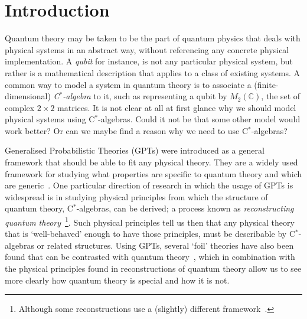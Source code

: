 \documentclass[a4paper,onecolumn,10pt,accepted=2019-05-03, issue=1, volume=1, shorttitle=papers/compositionality-1-1]{compositionalityarticle}
\numberwithin{counter}{section}
\newcommand{\C}{\mathbb{C}}
\begin{document}
\section{Introduction}
Quantum theory may be taken to be the part of quantum physics that deals with physical systems in an abstract way, without referencing any concrete physical implementation. A \emph{qubit} for instance, is not any particular physical system, but rather is a mathematical description that applies to a class of existing systems.
A common way to model a system in quantum theory is to associate a (finite-dimensional) \emph{C$^*$-algebra} to it, such as representing a qubit by $M_2(\C)$, the set of complex $2\times 2$ matrices. It is not clear at all at first glance why we should model physical systems using C$^*$-algebras. Could it not be that some other model would work better? Or can we maybe find a reason why we need to use C$^*$-algebras?

Generalised Probabilistic Theories (GPTs) were introduced as a general framework that should be able to fit any physical theory. They are a widely used framework for studying what properties are specific to quantum theory and which are generic~\cite{barrett2007information,barrett2017localstoch,chiribella2010probabilistic,barnum2007generalized,short2010entropy}. One particular direction of research in which the usage of GPTs is widespread is in studying physical principles from which the structure of quantum theory, C$^*$-algebras, can be derived; a process known as \emph{reconstructing quantum theory}~\cite{hardy2001quantum,masanes2011derivation,masanes2014entanglement,chiribella2011informational,dakic2009quantum,hardy2011reformulating,wilce2018royal,wetering2018sequential,gunson1967algebraic}\footnote{Although some reconstructions use a (slightly) different framework~\cite{barnum2014higher,selby2018reconstructing,tull2016reconstruction,fivel2012derivation,hohn2017toolbox,goyal2010information}.}. Such physical principles tell us then that any physical theory that is `well-behaved' enough to have those principles, must be describable by C$^*$-algebras or related structures.
Using GPTs, several `foil' theories have also been found that can be contrasted with quantum theory~\cite{spekkens2007toy,popescu2014nonlocality,chiribella2016purity,gogioso2017fantastic}, which in combination with the physical principles found in reconstructions of quantum theory allow us to see more clearly how quantum theory is special and how it is not.
\end{document}
